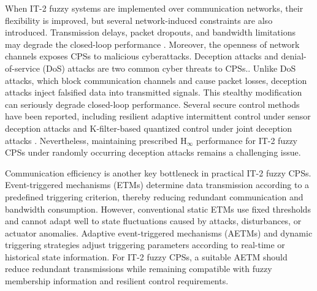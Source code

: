 \documentclass[preprint,review,fleqn,sort&compress,3p]{elsarticle}
\theoremstyle{definition} %
\theoremstyle{definition}%
\begin{document}
When IT-2 fuzzy systems are implemented over communication networks, their
flexibility is improved, but several network-induced constraints are also
introduced. Transmission delays, packet dropouts, and bandwidth limitations may
degrade the closed-loop performance \cite{zhangNetworkedControlSystems2020,pangNetworkedPredictiveControl2026}.
Moreover, the openness of network channels exposes CPSs to malicious cyberattacks.
Deception attacks
\cite{yaoSecureControlMarkovian2023c,lianSwitchingLikeEventTriggeredControl2021}
and denial-of-service (DoS) attacks
\cite{zhaDynamicEventTriggeredOutput2022, buEventTriggeredDataDrivenControl2023}
are two common cyber threats to CPSs.. Unlike DoS attacks, which block communication
channels and cause packet losses, deception attacks inject falsified data into
transmitted signals. This stealthy modification can seriously degrade closed-loop
performance. Several secure control methods have been
reported, including resilient adaptive intermittent control under sensor deception
attacks \cite{wangResilientAdaptiveIntermittent2024} and K-filter-based quantized
control under joint deception attacks \cite{wangResilientAdaptiveStabilization2025}.
Nevertheless, maintaining prescribed $\mathrm{H}_\infty$ performance for IT-2 fuzzy
CPSs under randomly occurring deception attacks remains a challenging issue.

Communication efficiency is another key bottleneck in practical IT-2 fuzzy CPSs.
Event-triggered mechanisms (ETMs)
\cite{postoyanFrameworkEventTriggeredStabilization2015,chenFinitetimeStabilityNonlinear2026}
determine data transmission according to a predefined triggering criterion, thereby reducing redundant communication and bandwidth consumption.
However, conventional static ETMs use fixed
thresholds and cannot adapt well to state fluctuations caused by attacks,
disturbances, or actuator anomalies. Adaptive event-triggered mechanisms (AETMs)
\cite{xingSwitchedFuzzyControl2024,duFaultTolerantHInfinityStabilization2025}
and dynamic triggering strategies \cite{tanDynamicMemoryEventTriggeredSlidingMode2025}
adjust triggering parameters according to real-time or historical state
information. For IT-2 fuzzy CPSs, a suitable AETM should reduce redundant
transmissions while remaining compatible with fuzzy membership information and
resilient control requirements.
\end{document}
